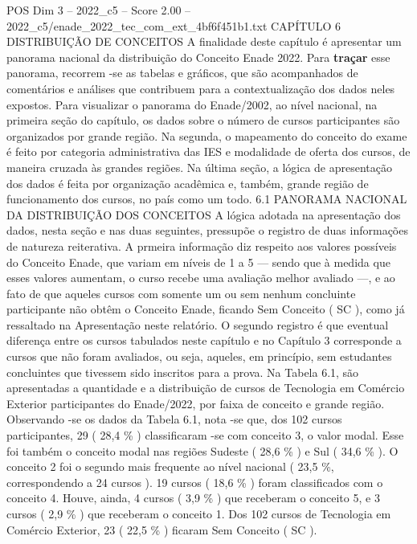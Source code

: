 \begin{textsample}{POS Dim 3 – 2022\_c5 – Score 2.00 – 2022\_c5/enade\_2022\_tec\_com\_ext\_4bf6f451b1.txt}  \label{ex:f3_pos_068}
CAPÍTULO 6 DISTRIBUIÇÃO DE CONCEITOS A finalidade deste capítulo é apresentar um panorama nacional da distribuição do Conceito Enade 2022.
Para \textbf{traçar} esse panorama, recorrem -se as tabelas e gráficos, que são acompanhados de comentários e análises que contribuem para a contextualização dos dados neles expostos.
Para visualizar o panorama do Enade/2002, ao nível nacional, na primeira seção do capítulo, os dados sobre o número de cursos participantes são organizados por grande região.
Na segunda, o mapeamento do conceito do exame é feito por categoria administrativa das IES e modalidade de oferta dos cursos, de maneira cruzada às grandes regiões.
Na última seção, a lógica de apresentação dos dados é feita por organização acadêmica e, também, grande região de funcionamento dos cursos, no país como um todo. 6.1 PANORAMA NACIONAL DA DISTRIBUIÇÃO DOS CONCEITOS A lógica adotada na apresentação dos dados, nesta seção e nas duas seguintes, pressupõe o registro de duas informações de natureza reiterativa.
A prmeira informação diz respeito aos valores possíveis do Conceito Enade, que variam em níveis de 1 a 5 — sendo que à medida que esses valores aumentam, o curso recebe uma avaliação melhor avaliado —, e ao fato de que aqueles cursos com somente um ou sem nenhum concluinte participante não obtêm o Conceito Enade, ficando Sem Conceito ( SC ), como já ressaltado na Apresentação neste relatório.
O segundo registro é que eventual diferença entre os cursos tabulados neste capítulo e no Capítulo 3 corresponde a cursos que não foram avaliados, ou seja, aqueles, em princípio, sem estudantes concluintes que tivessem sido inscritos para a prova.
Na Tabela 6.1, são apresentadas a quantidade e a distribuição de cursos de Tecnologia em Comércio Exterior participantes do Enade/2022, por faixa de conceito e grande região.
Observando -se os dados da Tabela 6.1, nota -se que, dos 102 cursos participantes, 29 ( 28,4 \% ) classificaram -se com conceito 3, o valor modal.
Esse foi também o conceito modal nas regiões Sudeste ( 28,6 \% ) e Sul ( 34,6 \% ).
O conceito 2 foi o segundo mais frequente ao nível nacional ( 23,5 \%, correspondendo a 24 cursos ). 19 cursos ( 18,6 \% ) foram classificados com o conceito 4.
Houve, ainda, 4 cursos ( 3,9 \% ) que receberam o conceito 5, e 3 cursos ( 2,9 \% ) que receberam o conceito 1.
Dos 102 cursos de Tecnologia em Comércio Exterior, 23 ( 22,5 \% ) ficaram Sem Conceito ( SC ).

\end{textsample}
